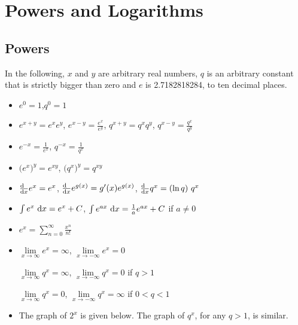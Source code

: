 
\graphicspath{{figs_powerlog/}}
\chapter{Powers and Logarithms}\label{app power log}





\section{Powers}\label{sec powers}
In the following, $x$ and $y$ are arbitrary real numbers,
$q$ is an arbitrary constant that is strictly bigger
than zero and $e$ is 2.7182818284, to ten decimal places.
\begin{itemize}
 \item 
     $e^0=1$,\quad $q^0=1$

\item 
         $e^{x+y}=e^xe^y$,\quad
         $e^{x-y}=\frac{e^x}{e^y}$,\quad
         $q^{x+y}=q^xq^y$,\quad
         $q^{x-y}=\frac{q^x}{q^y}$


\item 
   $e^{-x}=\frac{1}{e^x}$,\quad
   $q^{-x}=\frac{1}{q^x}$

\item 
    $\big(e^x\big)^y=e^{xy}$,\quad
    $\big(q^x\big)^y=q^{xy}$
\item 
    $\diff{\hfill}{x}e^x=e^x$,\quad
    $\diff{\hfill}{x}e^{g(x)}=g'(x)e^{g(x)}$,\quad
    $\diff{\hfill}{x}q^x=(\ln q)\ q^x$
\item
    $\int e^x\ \mathrm{d}x=e^x+C$,\quad
    $\int e^{ax}\ \mathrm{d}x=\frac{1}{a}e^{ax}+C$ if $a\ne 0$
\item
     $e^x =\sum\limits_{n=0}^\infty\frac{x^n}{n!}$
\item    
    $\lim\limits_{x\rightarrow\infty}e^x=\infty$, \quad
    $\lim\limits_{x\rightarrow-\infty}e^x=0$ 

    $\lim\limits_{x\rightarrow\infty}q^x=\infty$, \quad
    $\lim\limits_{x\rightarrow-\infty}q^x=0$ if $q>1$

    $\lim\limits_{x\rightarrow\infty}q^x=0$, \quad
    $\lim\limits_{x\rightarrow-\infty}q^x=\infty$ if $0<q<1$
\item  The graph of $2^x$ is given below. The graph of  $q^x$,
for any $q>1$, is similar.


\end{itemize}
